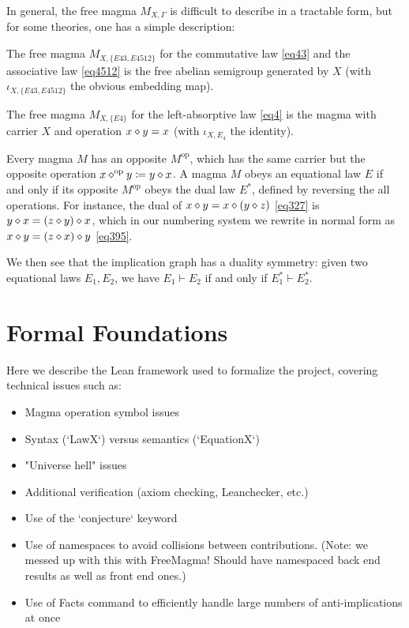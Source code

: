 In general, the free magma $M_{X,\Gamma}$ is difficult to describe in a tractable form, but for some theories, one has a simple description:

\begin{example} The free magma $M_{X,\{E43, E4512\}}$ for the commutative law \eqref{eq43} and the associative law \eqref{eq4512} is the free abelian semigroup generated by $X$ (with $\iota_{X,\{E43,E4512\}}$ the obvious embedding map).
\end{example}

\begin{example}\label{left-absorb}
The free magma $M_{X,\{E4\}}$ for the left-absorptive law \eqref{eq4} is the magma with carrier $X$ and operation $x \diamond y = x$ (with $\iota_{X,E_4}$ the identity).
\end{example}


Every magma $M$ has an opposite $M^{\mathrm{op}}$, which has the same carrier but the opposite operation $x \diamond^{\mathrm{op}} y \coloneqq y \diamond x$.  A magma $M$ obeys an equational law $E$ if and only if its opposite $M^{\mathrm{op}}$ obeys the dual law $E^*$, defined by reversing the all operations.  For instance, the dual of
$x \diamond y = x \diamond (y \diamond z)$ \eqref{eq327} is $y \diamond x = (z \diamond y) \diamond x$, which in our numbering system we rewrite in normal form as $x \diamond y = (z \diamond x) \diamond y$ \eqref{eq395}.

We then see that the implication graph has a duality symmetry: given two equational laws $E_1,E_2$, we have $E_1 \vdash E_2$ if and only if $E_1^* \vdash E_2^*$.

\section{Formal Foundations}


Here we describe the Lean framework used to formalize the project, covering technical issues such as:

\begin{itemize}
    \item Magma operation symbol issues
    \item Syntax (`LawX`) versus semantics (`EquationX`)
    \item "Universe hell" issues
    \item Additional verification (axiom checking, Leanchecker, etc.)
    \item Use of the `conjecture` keyword
    \item Use of namespaces to avoid collisions between contributions. (Note: we messed up with this with FreeMagma! Should have namespaced back end results as well as front end ones.)
    \item Use of Facts command to efficiently handle large numbers of anti-implications at once
\end{itemize}

